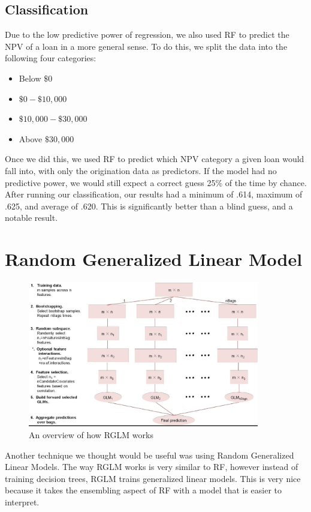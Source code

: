 \documentclass[12 pt]{uncw_thesis}
\theoremstyle{plain}
\theoremstyle{remark}
\theoremstyle{definition}
\begin{document}
\subsection{Classification}
Due to the low predictive power of regression, we also used RF to predict the NPV of a loan in a more general sense. To do this, we split the data into the following four categories: 
\begin{itemize}
	\item Below $\$0$
	\item $\$0 - \$10,000$
	\item $\$10,000 - \$30,000$
	\item Above $\$30,000$
\end{itemize}
Once we did this, we used RF to predict which NPV category a given loan would fall into, with only the origination data as predictors. If the model had no predictive power, we would still expect a correct guess 25\% of the time by chance. After running our classification, our results had a minimum of .614, maximum of .625, and average of .620. This is significantly better than a blind guess, and a notable result. 
\section{Random Generalized Linear Model}
\begin{figure}
	\includegraphics[width=0.9\textwidth]{images/RGLM.jpg}
	\caption{An overview of how RGLM works \cite{RGLM}}
	\label{fig:RGLM}
\end{figure}
Another technique we thought would be useful was using Random Generalized Linear Models. The way RGLM works is very similar to RF, however instead of training decision trees, RGLM trains generalized linear models. This is very nice because it takes the ensembling aspect of RF with a model that is easier to interpret.
\end{document}
